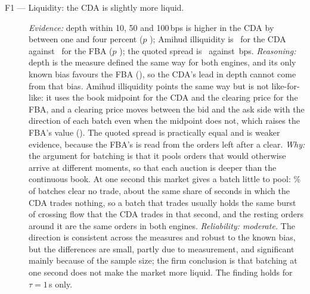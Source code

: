 \begin{description}
  \item[F1 --- Liquidity: the CDA is slightly more liquid.]
  \emph{Evidence:} depth within 10, 50 and 100\,bps is higher in the CDA by
  between one and four percent ($p$ \ResDepthWithinTenBpsP); Amihud
  illiquidity is \ResAmihudCda\ for the CDA against \ResAmihudFba\ for the
  FBA ($p$ \ResAmihudP); the quoted spread is \ResQuotedSpreadCda\ against
  \ResQuotedSpreadFba\,bps. \emph{Reasoning:} depth is the measure
  defined the same way for both engines, and its only known bias favours
  the FBA (), so the CDA's lead in depth cannot
  come from that bias. Amihud illiquidity points the same way but is not
  like-for-like: it uses the book midpoint for the CDA and the clearing
  price for the FBA, and a clearing price moves between the bid and the ask
  side with the direction of each batch even when the midpoint does not,
  which raises the FBA's value (). The quoted spread is
  practically equal and is weaker evidence, because the FBA's is read from
  the orders left after a clear. \emph{Why:} the argument for batching is
  that it pools orders that would otherwise arrive at different moments,
  so that each auction is deeper than the continuous book. At one second
  this market gives a batch little to pool: \FbaEmptyBatchShare\% of
  batches clear no trade, about the same share of seconds in which the CDA
  trades nothing, so a batch that trades usually holds the same burst of
  crossing flow that the CDA trades in that second, and the resting orders
  around it are the same orders in both engines. \emph{Reliability:
  moderate.} The direction is consistent across the measures and robust to
  the known bias, but the differences are small, partly due to
  measurement, and significant mainly because of the sample size; the
  firm conclusion is that batching at one second does not make the market
  more liquid. The finding holds for $\tau = 1$\,s only.


\end{description}
